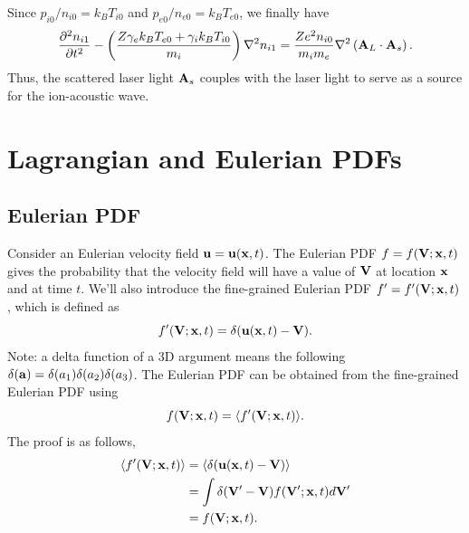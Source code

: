 \documentclass[a4paper,11pt]{report}
\begin{document}
Since $p_{i0}/n_{i0} = k_B T_{i0}$ and $p_{e0} / n_{e0} = k_B T_{e0}$, we finally have
\begin{equation}
    \frac{\partial^2 n_{i1}}{\partial t^2} - \left ( \frac{Z \gamma_e k_B T_{e0} + \gamma_i k_B T_{i0}}{m_i} \right ) \nabla^2 n_{i1} = \frac{Z e^2 n_{i0}}{m_i m_e} \nabla^2 \left (\mathbf{A}_L \cdot \mathbf{A}_s \right ).
\end{equation}
Thus, the scattered laser light $\mathbf{A}_s$ couples with the laser light to serve as a source for the ion-acoustic wave.

\appendix

\chapter{Lagrangian and Eulerian PDFs}

\section{Eulerian PDF}
Consider an Eulerian velocity field $\mathbf{u} = \mathbf{u}(\mathbf{x},t)$. The Eulerian PDF $f = f(\mathbf{V}; \mathbf{x},t)$ gives the probability that the velocity field will have a value of $\mathbf{V}$ at location $\mathbf{x}$ and at time $t$. We'll also introduce the fine-grained Eulerian PDF $f' = f'(\mathbf{V};\mathbf{x},t)$, which is defined as 
\begin{equation}
    f'(\mathbf{V}; \mathbf{x}, t) = \delta(\mathbf{u}(\mathbf{x},t) - \mathbf{V}).
\end{equation}
Note: a delta function of a 3D argument means the following $\delta(\mathbf{a}) = \delta(a_1) \delta(a_2) \delta(a_3) $. The Eulerian PDF can be obtained from the fine-grained Eulerian PDF using 
\begin{equation}
    \label{eq:fine_eul_pdf}
    f(\mathbf{V}; \mathbf{x}, t)=\langle f'(\mathbf{V}; \mathbf{x}, t) \rangle.
\end{equation}
The proof is as follows,
\begin{align}
    \langle f'(\mathbf{V}; \mathbf{x}, t) \rangle &= \langle \delta( \mathbf{u}(\mathbf{x},t) - \mathbf{V}) \rangle \nonumber \\
    &= \int \delta( \mathbf{V}' - \mathbf{V}) f(\mathbf{V}';\mathbf{x},t) d\mathbf{V}' \nonumber \\
    &= f(\mathbf{V}; \mathbf{x}, t).
\end{align}
\end{document}

